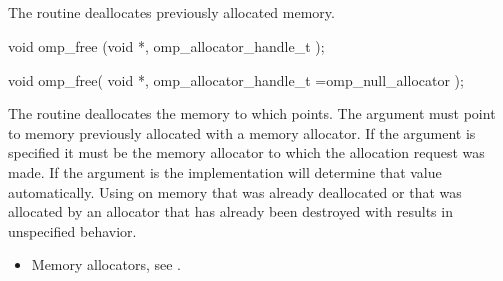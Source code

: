 \begin{ccppspecific}
\subsection{}
\label{subsec:omp_free}

\summary
The  routine deallocates previously allocated memory.

\format

\begin{cspecific}
\begin{ompcFunction}
void omp_free (void *, omp_allocator_handle_t );
\end{ompcFunction}
\end{cspecific}

\begin{cppspecific}
\begin{ompcFunction}
void omp_free(
  void *,
  omp_allocator_handle_t =omp_null_allocator
);
\end{ompcFunction}
\end{cppspecific}

\effect
The  routine deallocates the memory to which  
points. The  argument must point to memory previously allocated 
with a memory allocator. If the  argument is specified it 
must be the memory allocator to which the allocation request was made. If 
the  argument is  the implementation 
will determine that value automatically. Using  on memory 
that was already deallocated or that was allocated by an allocator that 
has already been destroyed with  results in 
unspecified behavior.

\crossreferences
\begin{itemize}
\item Memory allocators, see .
\end{itemize}

\end{ccppspecific}
